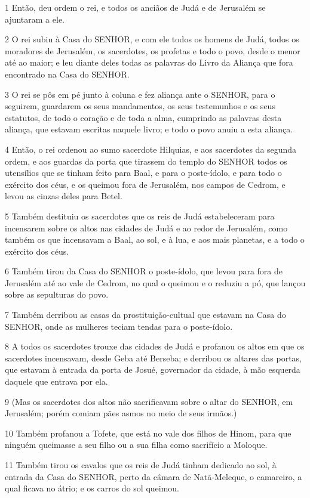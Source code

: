 \par 1 Então, deu ordem o rei, e todos os anciãos de Judá e de Jerusalém se ajuntaram a ele.
\par 2 O rei subiu à Casa do SENHOR, e com ele todos os homens de Judá, todos os moradores de Jerusalém, os sacerdotes, os profetas e todo o povo, desde o menor até ao maior; e leu diante deles todas as palavras do Livro da Aliança que fora encontrado na Casa do SENHOR.
\par 3 O rei se pôs em pé junto à coluna e fez aliança ante o SENHOR, para o seguirem, guardarem os seus mandamentos, os seus testemunhos e os seus estatutos, de todo o coração e de toda a alma, cumprindo as palavras desta aliança, que estavam escritas naquele livro; e todo o povo anuiu a esta aliança.
\par 4 Então, o rei ordenou ao sumo sacerdote Hilquias, e aos sacerdotes da segunda ordem, e aos guardas da porta que tirassem do templo do SENHOR todos os utensílios que se tinham feito para Baal, e para o poste-ídolo, e para todo o exército dos céus, e os queimou fora de Jerusalém, nos campos de Cedrom, e levou as cinzas deles para Betel.
\par 5 Também destituiu os sacerdotes que os reis de Judá estabeleceram para incensarem sobre os altos nas cidades de Judá e ao redor de Jerusalém, como também os que incensavam a Baal, ao sol, e à lua, e aos mais planetas, e a todo o exército dos céus.
\par 6 Também tirou da Casa do SENHOR o poste-ídolo, que levou para fora de Jerusalém até ao vale de Cedrom, no qual o queimou e o reduziu a pó, que lançou sobre as sepulturas do povo.
\par 7 Também derribou as casas da prostituição-cultual que estavam na Casa do SENHOR, onde as mulheres teciam tendas para o poste-ídolo.
\par 8 A todos os sacerdotes trouxe das cidades de Judá e profanou os altos em que os sacerdotes incensavam, desde Geba até Berseba; e derribou os altares das portas, que estavam à entrada da porta de Josué, governador da cidade, à mão esquerda daquele que entrava por ela.
\par 9 (Mas os sacerdotes dos altos não sacrificavam sobre o altar do SENHOR, em Jerusalém; porém comiam pães asmos no meio de seus irmãos.)
\par 10 Também profanou a Tofete, que está no vale dos filhos de Hinom, para que ninguém queimasse a seu filho ou a sua filha como sacrifício a Moloque.
\par 11 Também tirou os cavalos que os reis de Judá tinham dedicado ao sol, à entrada da Casa do SENHOR, perto da câmara de Natã-Meleque, o camareiro, a qual ficava no átrio; e os carros do sol queimou.
